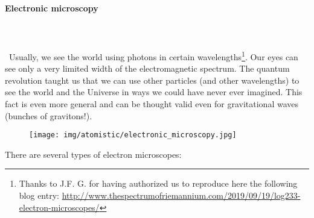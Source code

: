 	\paragraph{Electronic microscopy}\label{electronic microscopy}\mbox{}\\\\\
	Usually, we see the world using photons in certain wavelengths\footnote{Thanks to J.F. G. for having authorized us to reproduce here the following blog entry: \url{http://www.thespectrumofriemannium.com/2019/09/19/log233-electron-microscopes/}}. Our eyes can see only a very limited width of the electromagnetic spectrum. The quantum revolution taught us that we can use other particles (and other wavelengths) to see the world and the Universe in ways we could have never ever imagined. This fact is even more general and can be thought valid even for gravitational waves (bunches of gravitons!).
	\begin{figure}[H]
		\centering
		\texttt{[image: img/atomistic/electronic\_microscopy.jpg]}
	\end{figure} 
	There are several types of electron microscopes:
